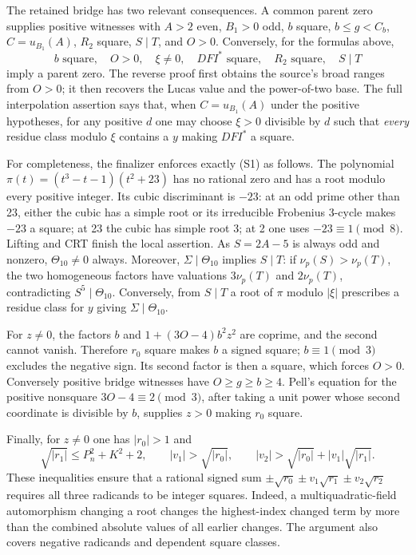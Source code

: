 The retained bridge has two relevant consequences.  A common parent
zero supplies positive witnesses with $A>2$ even, $B_1>0$ odd,
$b$ square, $b\leq g<C_b$, $C=u_{B_1}(A)$, $R_2$ square,
$S\mid T$, and $O>0$.  Conversely, for the formulas above,
\[
 b\text{ square},\quad O>0,\quad\xi\ne0,\quad
 DFI^*\text{ square},\quad R_2\text{ square},\quad S\mid T
 \tag{S1}
\]
imply a parent zero.  The reverse proof first obtains the source's
broad ranges from $O>0$; it then recovers the Lucas value and the
power-of-two base.  The full interpolation assertion says that, when
$C=u_{B_1}(A)$ under the positive hypotheses, for any positive $d$
one may choose $\xi>0$ divisible by $d$ such that \emph{every}
residue class modulo $\xi$ contains a $y$ making $DFI^*$ a square.

For completeness, the finalizer enforces exactly (S1) as follows.
The polynomial $\pi(t)=(t^3-t-1)(t^2+23)$ has no rational zero and has
a root modulo every positive integer.  Its cubic discriminant is
$-23$: at an odd prime other than 23, either the cubic has a simple
root or its irreducible Frobenius 3-cycle makes $-23$ a square; at 23
the cubic has simple root 3; at 2 one uses $-23\equiv1\pmod8$.
Lifting and CRT finish the local assertion.  As $S=2A-5$ is always
odd and nonzero, $\Theta_{10}\ne0$ always.  Moreover,
$\Sigma\mid\Theta_{10}$ implies $S\mid T$: if
$\nu_p(S)>\nu_p(T)$, the two homogeneous factors have valuations
$3\nu_p(T)$ and $2\nu_p(T)$, contradicting $S^5\mid\Theta_{10}$.
Conversely, from $S\mid T$ a root of $\pi$ modulo $|\xi|$ prescribes
a residue class for $y$ giving $\Sigma\mid\Theta_{10}$.

For $z\ne0$, the factors $b$ and $1+(3O-4)b^2z^2$ are coprime, and
the second cannot vanish.  Therefore $r_0$ square makes $b$ a signed
square; $b\equiv1\pmod3$ excludes the negative sign.  Its second
factor is then a square, which forces $O>0$.  Conversely positive
bridge witnesses have $O\geq g\geq b\geq4$.  Pell's equation for the
positive nonsquare $3O-4\equiv2\pmod3$, after taking a unit power
whose second coordinate is divisible by $b$, supplies $z>0$ making
$r_0$ square.

Finally, for $z\ne0$ one has $|r_0|>1$ and
\[
 \sqrt{|r_1|}\leq P_n^2+K^2+2,\qquad
 |v_1|>\sqrt{|r_0|},\qquad
 |v_2|>\sqrt{|r_0|}+|v_1|\sqrt{|r_1|}.
\]
These inequalities ensure that a rational signed sum
$\pm\sqrt{r_0}\pm v_1\sqrt{r_1}\pm v_2\sqrt{r_2}$ requires all
three radicands to be integer squares.  Indeed, a multiquadratic-field
automorphism changing a root changes the highest-index changed term
by more than the combined absolute values of all earlier changes.
The argument also covers negative radicands and dependent square
classes.

